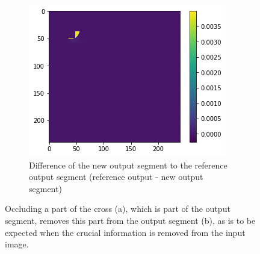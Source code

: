 \begin{figure}[H]
    \begin{subfigure}[t]{.33\textwidth}
        \centering
        \includegraphics[width=\linewidth]{chapters/06_hdm/images_analyze/3c_diff.png}
        \caption{Difference of the new output segment to the reference output segment (reference output - new output segment)}
    \end{subfigure}
    \caption{Occluding a part of the cross (a), which is part of the output segment, removes this part from the output segment (b), as is to be expected when the crucial information is removed from the input image.}
    \label{hdm_changed_output_3}
\end{figure}


